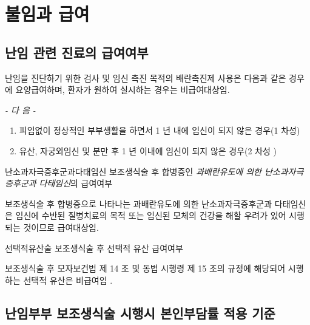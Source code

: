 \section{불임과 급여}
\subsection{난임 관련 진료의 급여여부}
난임을 진단하기 위한 검사 및 임신 촉진 목적의 배란촉진제 사용은 다음과 같은 경우에 요양급여하며, 환자가 원하여 실시하는 경우는 비급여대상임.\par
\emph{- 다 음 -}
\begin{enumerate}[가.]\tightlist
\item 피임없이 정상적인 부부생활을 하면서 1 년 내에 임신이 되지 않은 경우(1 차성)
\item 유산, 자궁외임신 및 분만 후 1 년 이내에 임신이 되지 않은 경우(2 차성 )
\end{enumerate}

\begin{commentbox}{난소과자극증후군과다태임신}
보조생식술 후 합병증인 \emph{과배란유도에 의한 난소과자극증후군과 다태임신}의 급여여부\par
보조생식술 후 합병증으로 나타나는 과배란유도에 의한 난소과자극증후군과 다태임신은 임신에 수반된 질병치료의 목적 또는 임신된 모체의 건강을 해할 우려가 있어 시행되는 것이므로 급여대상임.
\end{commentbox}

\begin{commentbox}{선택적유산술} 
보조생식술 후 선택적 유산 급여여부\par 
보조생식술 후 모자보건법 제 14 조 및 동법 시행령 제 15 조의  규정에  해당되어 시행하는 선택적 유산은 비급여임 . 
\end{commentbox}
\subsection{난임부부 보조생식술 시행시  본인부담률 적용 기준} 
 
